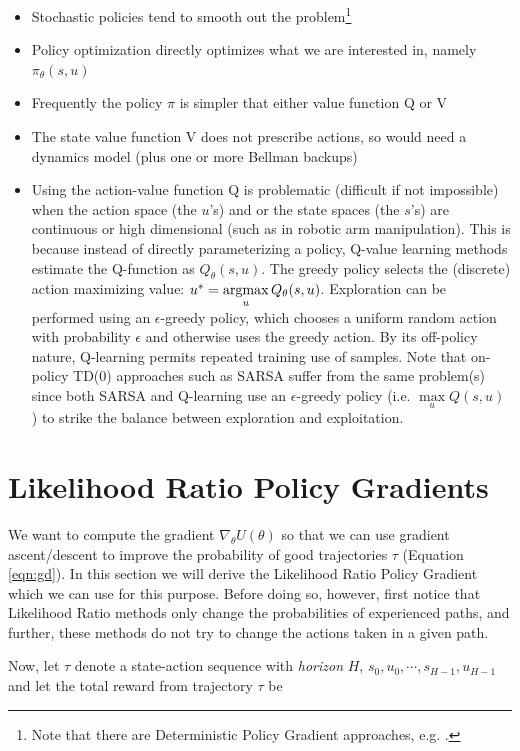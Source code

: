 \documentclass[11pt, oneside]{article}   	%
\newcommand{\argmax}{\operatornamewithlimits{argmax}}
\begin{document}
\begin{itemize}
\item Stochastic policies tend to smooth out the problem\footnote{Note that there are Deterministic Policy Gradient approaches,
 e.g. \cite{Silver:2014:DPG:3044805.3044850}.}
\item Policy optimization directly optimizes what we are interested in, namely $\pi_{\theta}(s,u)$
\item Frequently the policy $\pi$ is simpler that either value function Q or V
\item The state value function V does not prescribe actions, so would need a dynamics model (plus one or more Bellman backups)
\item Using the action-value function Q is problematic (difficult if not impossible) when the action space (the $u$'s) and or the state
spaces (the $s$'s) are continuous or high dimensional (such as in robotic arm manipulation). This is because instead of directly parameterizing a policy, 
Q-value learning methods estimate the Q-function as $Q_{\theta}(s, u)$. The greedy policy selects the (discrete) action maximizing value:
$u^{*}= \argmax\limits_{u} Q_{\theta}(s, u)$. Exploration can be performed using an $\epsilon$-greedy policy, which chooses a uniform random action with probability 
$\epsilon$ and otherwise uses the greedy action. By its off-policy nature, Q-learning permits repeated training use of samples. Note that on-policy TD(0) approaches 
such as SARSA \cite{SuttonBook} suffer from the same problem(s) since both SARSA and Q-learning use an $\epsilon$-greedy policy (i.e. $\max\limits_u Q(s,u)$ ) 
to strike the balance between exploration and exploitation.
\end{itemize}

\section{Likelihood Ratio Policy Gradients}

We want to compute the gradient $\nabla_{\theta} U(\theta)$ so that we can use gradient ascent/descent to improve the probability of good trajectories $\tau$ 
(Equation \ref{eqn:gd}). In this section we will derive the Likelihood Ratio Policy Gradient which we can use for this purpose.  Before doing so, however, first 
notice that Likelihood Ratio methods only change the probabilities of experienced paths, and further, these methods do not try to change the  actions taken in a given path. 

\bigskip
\noindent
Now, let $\tau$ denote a state-action sequence with \emph{horizon} $H$,  $s_0,u_0,\cdots,s_{H - 1},u_{H - 1}$ and let the total reward from 
trajectory $\tau$ be 
\end{document}
